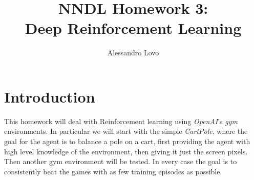 \documentclass[a4paper, 11pt]{article}
\begin{document}
\title{NNDL Homework 3: \\ Deep Reinforcement Learning}
\author{Alessandro Lovo}
\maketitle

\section{Introduction}
  This homework will deal with Reinforcement learning using \emph{OpenAI}'s \emph{gym} environments. In particular we will start with the simple \emph{CartPole}, where the goal for the agent is to balance a pole on a cart, first providing the agent with high level knowledge of the environment, then giving it just the screen pixels. Then another gym environment will be tested. In every case the goal is to consistently beat the games with as few training episodes as possible.
\end{document}
